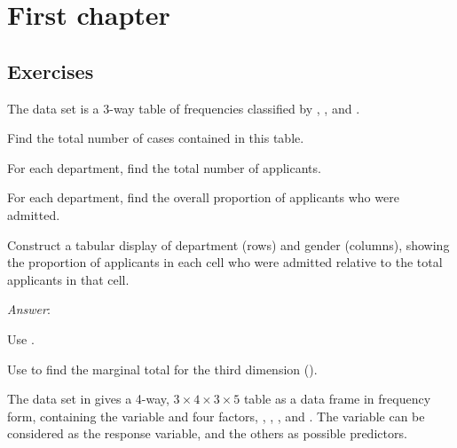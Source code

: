 \documentclass[10pt]{report}
\newcommand{\showanswers}{TRUE}  %
\newcommand{\answserstart}{\noindent\emph{Answer}:}
\newcommand{\answerfont}{\sffamily}
\newenvironment{answer}%
  {%
      \ifthenelse{\isundefined{\showanswers}}%
              {\expandafter\comment}%
              {\answserstart\answerfont}%
  }%
  {%
      \ifthenelse{\isundefined{\showanswers}}%
              {\expandafter\endcomment}%
              {}%
  }
\begin{document}
\chapter{First chapter}
\section{Exercises}

\begin{Exercises}

\exercise The data set  is a 3-way table of frequencies
classified by , , and .
  \begin{enumerate*}
    \item Find the total number of cases contained in this table.
    \item For each department, find the total number of applicants.
    \item For each department, find the overall proportion of applicants who were admitted.
    \item Construct a tabular display of department (rows) and gender (columns), showing
    the proportion of applicants in each cell who were admitted
    relative to the total applicants in that cell.
  \end{enumerate*}
\begin{answer}
	\begin{enumerate*}
		\item Use .
		\item Use  to find the marginal total for the third dimension ().
		\item
	\end{enumerate*}
\end{answer}

\exercise The data set  in  
gives a 4-way, $3 \times 4 \times 3 \times 5$ 
table as a data frame in
frequency form, containing the variable  and four factors,
,
,
, and
.  The variable  can be considered as the
response variable, and the others as possible predictors.


\end{Exercises}
\end{document}
